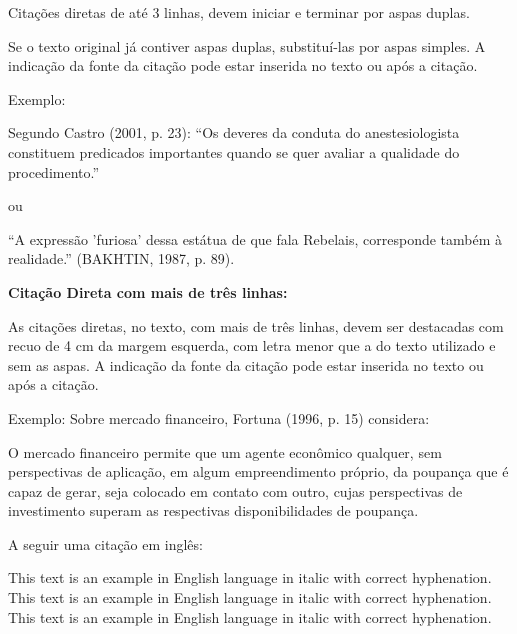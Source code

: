     \bigskip

    Citações diretas de até 3 linhas, devem iniciar e terminar por aspas duplas.

    Se o texto original já contiver aspas duplas, substituí-las por aspas simples. A indicação da fonte da citação pode estar inserida no texto ou após a citação.

    \bigskip

    {\color{red} Exemplo:}

    \bigskip

    Segundo Castro (2001, p. 23): ``Os deveres da conduta do anestesiologista constituem predicados importantes quando se quer avaliar a qualidade do procedimento.''


    \bigskip

    {\color{red} ou}

    \bigskip

    ``A expressão 'furiosa' dessa estátua de que fala Rebelais, corresponde também à realidade.'' (BAKHTIN, 1987, p. 89).

    \bigskip

    {\centering\bfseries\color{red} Citação Direta com mais de três linhas: \par}

    \bigskip

    As citações diretas, no texto, com mais de três linhas, devem ser destacadas com recuo de 4 cm da margem esquerda, com letra menor que a do texto utilizado e sem as aspas. A indicação da fonte da citação pode estar inserida no texto ou após a citação.

    \bigskip

    {\color{red} Exemplo:}
    \bigskip
    Sobre mercado financeiro, Fortuna (1996, p. 15) considera:
    \bigskip

    \begin{citacao}
      O mercado financeiro permite que um agente econômico qualquer, sem perspectivas de aplicação, em algum empreendimento próprio, da poupança que é capaz de gerar, seja colocado em contato com outro, cujas perspectivas de investimento superam as respectivas disponibilidades de poupança.
    \end{citacao}

    \bigskip
    A seguir uma citação em inglês:

    \begin{citacao}[english]
      This text is an example in English language in italic with correct hyphenation. This text is an example in English language in italic with correct hyphenation. This text is an example in English language in italic with correct hyphenation.
    \end{citacao}
    \bigskip


